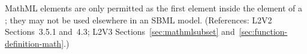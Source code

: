 MathML  elements are only permitted as the first element
inside the  element of a \FunctionDefinition; they may not be
used elsewhere in an SBML model.  (References: L2V2 Sections~3.5.1 and~4.3;
L2V3 Sections~\ref{sec:mathmlsubset} and~\ref{sec:function-definition-math}.)

